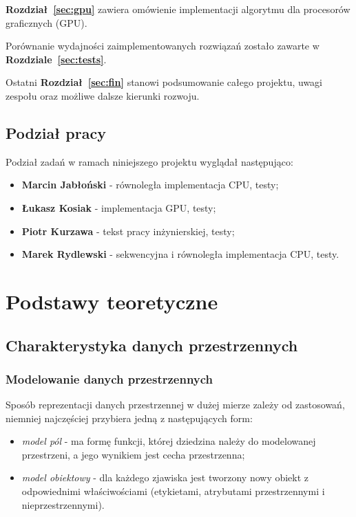\documentclass[12pt]{article}
\begin{document}
\textbf{Rozdział~\ref{sec:gpu}} zawiera omówienie implementacji algorytmu dla procesorów graficznych (GPU).

Porównanie wydajności zaimplementowanych rozwiązań zostało zawarte w \textbf{Rozdziale~\ref{sec:tests}}. 

Ostatni \textbf{Rozdział~\ref{sec:fin}} stanowi podsumowanie całego projektu, uwagi zespołu oraz możliwe dalsze kierunki rozwoju.

\subsection{Podział pracy}

Podział zadań w ramach niniejszego projektu wyglądał następująco:

\begin{itemize}
\item \textbf{Marcin Jabłoński} - równoległa implementacja CPU, testy;
\item \textbf{Łukasz Kosiak} - implementacja GPU, testy;
\item \textbf{Piotr Kurzawa} - tekst pracy inżynierskiej, testy;
\item \textbf{Marek Rydlewski} - sekwencyjna i równoległa implementacja CPU, testy.
\end{itemize}

\newpage

\section{Podstawy teoretyczne}
\label{sec:theory}

\subsection{Charakterystyka danych przestrzennych}

\subsubsection{Modelowanie danych przestrzennych}

Sposób reprezentacji danych przestrzennej w dużej mierze zależy od zastosowań, niemniej najczęściej przybiera jedną z następujących form:

\begin{itemize}
\item \textit{model pól} - ma formę funkcji, której dziedzina należy do modelowanej przestrzeni, a jego wynikiem jest cecha przestrzenna;
\item \textit{model obiektowy} - dla każdego zjawiska jest tworzony nowy obiekt z odpowiednimi właściwościami (etykietami, atrybutami przestrzennymi i nieprzestrzennymi).
\end{itemize}
\end{document}
